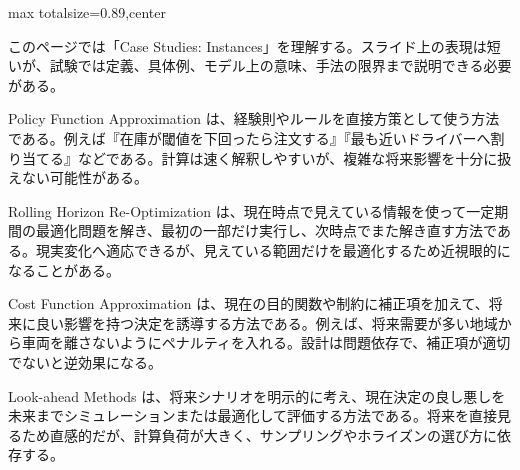 \begin{minipage}[t]{0.58\textwidth}
\begin{adjustbox}{max totalsize={\textwidth}{0.89\textheight},center}
\begin{minipage}{\textwidth}\scriptsize
{}このページでは「Case Studies: Instances」を理解する。スライド上の表現は短いが、試験では定義、具体例、モデル上の意味、手法の限界まで説明できる必要がある。\par
Policy Function Approximation は、経験則やルールを直接方策として使う方法である。例えば『在庫が閾値を下回ったら注文する』『最も近いドライバーへ割り当てる』などである。計算は速く解釈しやすいが、複雑な将来影響を十分に扱えない可能性がある。\par
Rolling Horizon Re-Optimization は、現在時点で見えている情報を使って一定期間の最適化問題を解き、最初の一部だけ実行し、次時点でまた解き直す方法である。現実変化へ適応できるが、見えている範囲だけを最適化するため近視眼的になることがある。\par
Cost Function Approximation は、現在の目的関数や制約に補正項を加えて、将来に良い影響を持つ決定を誘導する方法である。例えば、将来需要が多い地域から車両を離さないようにペナルティを入れる。設計は問題依存で、補正項が適切でないと逆効果になる。\par
Look-ahead Methods は、将来シナリオを明示的に考え、現在決定の良し悪しを未来までシミュレーションまたは最適化して評価する方法である。将来を直接見るため直感的だが、計算負荷が大きく、サンプリングやホライズンの選び方に依存する。\par

\end{minipage}
\end{adjustbox}
\end{minipage}
